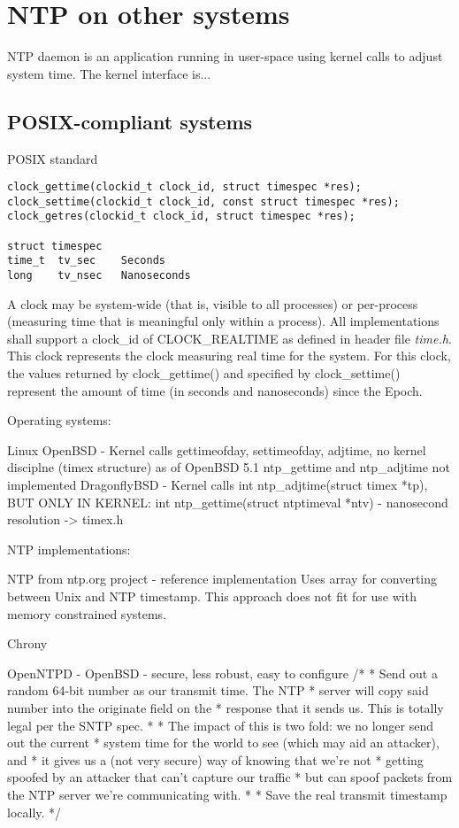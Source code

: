
\chapter{NTP on other systems}

NTP daemon is an application running in user-space using kernel calls to adjust system time.
The kernel interface is...

\section{POSIX-compliant systems}\label{sec:posix}
POSIX standard
\begin{lstlisting}[morekeywords={clockid_t,time_t}]
clock_gettime(clockid_t clock_id, struct timespec *res);
clock_settime(clockid_t clock_id, const struct timespec *res);
clock_getres(clockid_t clock_id, struct timespec *res);

struct timespec
time_t  tv_sec    Seconds
long    tv_nsec   Nanoseconds
\end{lstlisting}
A clock may be system-wide (that is, visible to all processes)
or per-process (measuring time that is meaningful only within a process).
All implementations shall support a clock\_id of CLOCK\_REALTIME as
defined in header file {\it{time.h}}.
This clock represents the clock measuring real time for the system.
For this clock, the values returned by clock\_gettime() and specified
by clock\_settime() represent the amount
of time (in seconds and nanoseconds) since the Epoch.


Operating systems:

Linux
OpenBSD - Kernel calls gettimeofday, settimeofday, adjtime, no kernel disciplne (timex structure)
as of OpenBSD 5.1 ntp\_gettime and ntp\_adjtime not implemented
DragonflyBSD - Kernel calls int ntp\_adjtime(struct timex *tp),
BUT ONLY IN KERNEL: int ntp\_gettime(struct ntptimeval *ntv) - nanosecond resolution -> timex.h

NTP implementations:

NTP from ntp.org project - reference implementation
Uses array for converting between Unix and NTP timestamp.
This approach does not fit for use with memory constrained systems.

Chrony

OpenNTPD - OpenBSD - secure, less robust, easy to configure
	/*
	 * Send out a random 64-bit number as our transmit time.  The NTP
	 * server will copy said number into the originate field on the
	 * response that it sends us.  This is totally legal per the SNTP spec.
	 *
	 * The impact of this is two fold: we no longer send out the current
	 * system time for the world to see (which may aid an attacker), and
	 * it gives us a (not very secure) way of knowing that we're not
	 * getting spoofed by an attacker that can't capture our traffic
	 * but can spoof packets from the NTP server we're communicating with.
	 *
	 * Save the real transmit timestamp locally.
	 */

